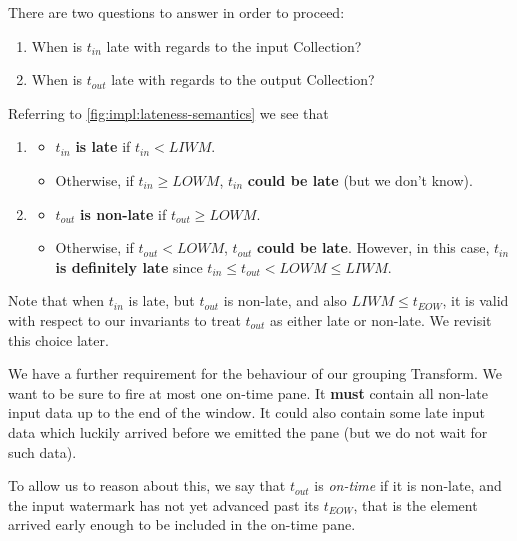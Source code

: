 There are two questions to answer in order to proceed:
\begin{enumerate}
	\item When is $t_{\mathit{in}}$ late with regards to the input Collection?
	\item When is $t_{\mathit{out}}$ late with regards to the output Collection?
\end{enumerate}

Referring to \cref{fig:impl:lateness-semantics} we see that
\begin{enumerate}
	\item \begin{itemize}
	\item $t_{\mathit{in}}$ \textbf{is late} if $t_{\mathit{in}} < \mathit{LIWM}$.
	\item Otherwise, if $t_{\mathit{in}} \geq \mathit{LOWM}$, $t_{\mathit{in}}$ \textbf{could be late} (but we don't know).
	\end{itemize}
	\item \begin{itemize}
	\item $t_{\mathit{out}}$ \textbf{is non-late} if $t_{\mathit{out}} \geq \mathit{LOWM}$.
	\item Otherwise, if $t_{\mathit{out}} < \mathit{LOWM}$, $t_{\mathit{out}}$ \textbf{could be late}. However, in this case, $t_{\mathit{in}}$ \textbf{is definitely late} since $t_{\mathit{in}} \leq t_{\mathit{out}} < \mathit{LOWM} \leq \mathit{LIWM}$.
	\end{itemize}
\end{enumerate}

Note that when $t_{\mathit{in}}$ is late, but $t_{\mathit{out}}$ is non-late, and also $\mathit{LIWM} \leq t_{\mathit{EOW}}$, it is valid with respect to our invariants to treat $t_{\mathit{out}}$ as either late or non-late.
We revisit this choice later.

We have a further requirement for the behaviour of our grouping Transform.
We want to be sure to fire at most one on-time pane.
It \textbf{must} contain all non-late input data up to the end of the window.
It could also contain some late input data which luckily arrived before we emitted the pane (but we do not wait for such data).

To allow us to reason about this, we say that $t_{\mathit{out}}$ is \emph{on-time} if it is non-late, and the input watermark has not yet advanced past its $t_{\mathit{EOW}}$, that is the element arrived early enough to be included in the on-time pane.

